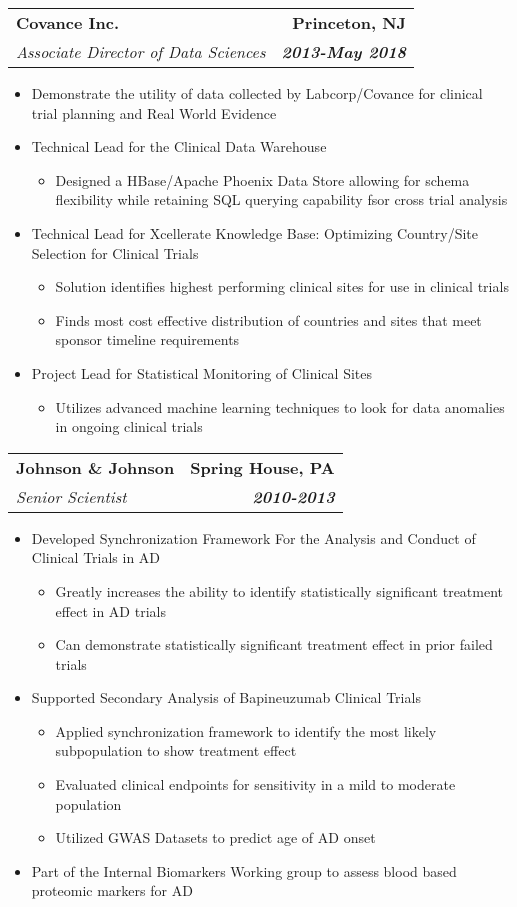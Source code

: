 \documentclass[letterpaper,9pt]{article}
\makeatletter
\newcommand{\resitem}[1]{\item #1 \vspace{-2pt}}
\newcommand{\ressubheading}[4]{
\begin{tabular*}{6.5in}{l@{\extracolsep{\fill}}r}
		\textbf{#1} & {#2} \\
		\textit{#3} & \textit{#4} \\
\end{tabular*}\vspace{-6pt}}
\makeatother
\begin{document}
\ressubheading{Covance Inc.}{\textbf{Princeton, NJ}}{Associate Director of Data Sciences}{\textbf{2013-May 2018}}
\begin{itemize}
	\resitem {Demonstrate the utility of data collected by Labcorp/Covance for clinical trial planning and Real World Evidence}
	\resitem{Technical Lead for the  Clinical Data Warehouse}
		\begin{itemize}
			\item Designed a HBase/Apache Phoenix Data Store allowing for schema flexibility while retaining SQL querying capability fsor cross trial analysis
		\end{itemize}
	\resitem{Technical Lead for Xcellerate Knowledge Base: Optimizing Country/Site Selection for Clinical Trials}
		\begin{itemize}
		\item Solution identifies highest performing clinical sites for use in clinical trials
		\item Finds most cost effective distribution of countries and sites that meet sponsor timeline requirements
		\end{itemize}
	\resitem{Project Lead for Statistical Monitoring of Clinical Sites}
	\begin{itemize}
	\item Utilizes advanced machine learning techniques to look for data anomalies in ongoing clinical trials
\end{itemize}
\end{itemize}

\ressubheading{Johnson \& Johnson}{\textbf{Spring House, PA}}{Senior Scientist}{\textbf{2010-2013}}
\begin{itemize}
\resitem{Developed Synchronization Framework For the Analysis and Conduct of Clinical Trials in AD}
\begin{itemize}
\item Greatly increases the ability to identify statistically significant treatment effect in AD trials
\item Can demonstrate statistically significant treatment effect in prior failed trials
\end{itemize}
\resitem{Supported Secondary Analysis of Bapineuzumab Clinical Trials}
\begin{itemize}
\item Applied synchronization framework to identify the most likely subpopulation to show treatment effect
\item Evaluated clinical endpoints for sensitivity in a mild to moderate population
\item Utilized GWAS Datasets to predict age of AD onset
\end{itemize}
\resitem{Part of the Internal Biomarkers Working group to assess blood based proteomic markers for AD}

\end{itemize}
\end{document}
